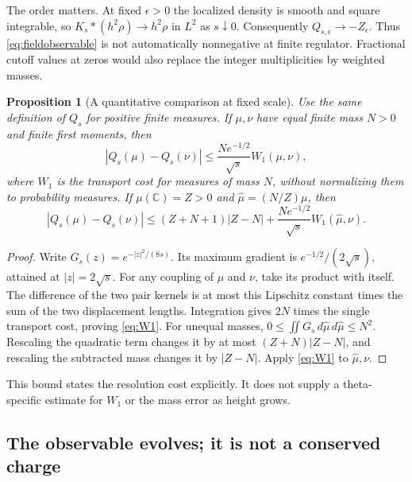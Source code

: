 \documentclass[11pt]{article}
\newcommand{\C}{\mathbb C}
\newcommand{\dd}{\,d}
\newcommand{\eps}{\epsilon}
\newtheorem{proposition}[theorem]{Proposition}
\theoremstyle{definition}
\theoremstyle{remark}
\begin{document}
The order matters. At fixed $\eps>0$ the localized density is smooth
and square integrable, so $K_s*(h^2\rho)\to h^2\rho$ in $L^2$ as
$s\downarrow0$. Consequently $Q_{s,\eps}\to-Z_\eps$. Thus
\eqref{eq:fieldobservable} is not automatically nonnegative at finite
regulator. Fractional cutoff values at zeros would also replace the
integer multiplicities by weighted masses.

\begin{proposition}[A quantitative comparison at fixed scale]
\label{prop:W1}
Use the same definition of $Q_s$ for positive finite measures.
If $\mu,\nu$ have equal finite mass $N>0$ and finite
first moments, then
\begin{equation}
 |Q_s(\mu)-Q_s(\nu)|
 \le\frac{N e^{-1/2}}{\sqrt s}W_1(\mu,\nu),
 \label{eq:W1}
\end{equation}
where $W_1$ is the transport cost for measures of mass $N$, without
normalizing them to probability measures. If $\mu(\C)=Z>0$ and
$\widehat\mu=(N/Z)\mu$, then
\begin{equation}
 |Q_s(\mu)-Q_s(\nu)|
 \le(Z+N+1)|Z-N|
   +\frac{N e^{-1/2}}{\sqrt s}W_1(\widehat\mu,\nu).
 \label{eq:W1mass}
\end{equation}
\end{proposition}
\begin{proof}
Write $G_s(z)=e^{-|z|^2/(8s)}$. Its maximum gradient is
$e^{-1/2}/(2\sqrt s)$, attained at $|z|=2\sqrt s$.
For any coupling of $\mu$ and $\nu$, take its product with itself.
The difference of the two pair kernels is at most this Lipschitz
constant times the sum of the two displacement lengths. Integration
gives $2N$ times the single transport cost, proving \eqref{eq:W1}.
For unequal masses, $0\le\iint G_s\dd\widehat\mu\dd\widehat\mu\le N^2$.
Rescaling the quadratic term changes it by at most
$(Z+N)|Z-N|$, and rescaling the subtracted mass changes it by
$|Z-N|$. Apply \eqref{eq:W1} to $\widehat\mu,\nu$.
\end{proof}

This bound states the resolution cost explicitly. It does not supply a
theta-specific estimate for $W_1$ or the mass error as height grows.

\subsection{The observable evolves; it is not a conserved charge}
\end{document}
